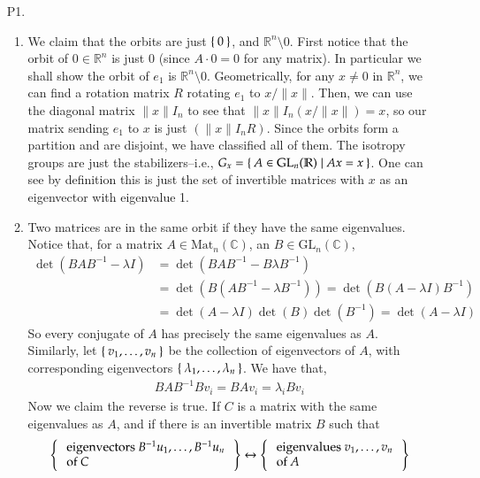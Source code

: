 \documentclass[12pt]{article}
\theoremstyle{definitionstyle}
\def\mbb#1{\mathbb{#1}}
\def \C{\mbb{C}}
\def \R{\mbb{R}}
\newcommand{\mg}[1]{\| #1 \|}
\begin{document}
\begin{enumerate}[leftmargin=\labelsep]
		\item[P1.]
		\begin{enumerate}
			\item We claim that the orbits are just $\Set{0}$, and $\R^n \setminus 0$. First notice that the orbit of $0 \in \R^n$ is just $0$ (since $A \cdot 0 = 0$ for any matrix). In particular we shall show the orbit of $e_1$ is $\R^n \setminus 0$. Geometrically, for any $x \neq 0$ in $\R^n$, we can find a rotation matrix $R$ rotating $e_1$ to $x/\mg{x}$. Then, we can use the diagonal matrix $\mg{x} I_n$ to see that $\mg{x} I_n (x/\mg{x}) = x$, so our matrix sending $e_1$ to $x$ is just $(\mg{x}I_nR)$. Since the orbits form a partition and are disjoint, we have classified all of them. The isotropy groups are just the stabilizers--i.e., $G_x = \Set{A \in \mathrm{GL}_n(\R) | Ax = x}$. One can see by definition this is just the set of invertible matrices with $x$ as an eigenvector with eigenvalue 1. 
			
			\item Two matrices are in the same orbit if they have the same eigenvalues. Notice that, for a matrix $A \in \mathrm{Mat}_n(\C)$, an $B \in \mathrm{GL}_n(\C)$,
			\begin{align*}
				\det(BAB^{-1} - \lambda I) &= \det(BAB^{-1} -  B\lambda B^{-1}) 
				\\&= \det(B(AB^{-1} - \lambda B^{-1})) = \det(B(A-\lambda I)B^{-1}) 
				\\&= \det(A-\lambda I)\det(B)\det(B^{-1}) = \det(A-\lambda I)
			\end{align*}
			So every conjugate of $A$ has precisely the same eigenvalues as $A$. Similarly, let $\Set{v_1, \ldots, v_n}$ be the collection of eigenvectors of $A$, with corresponding eigenvectors $\Set{\lambda_1, \ldots, \lambda_n}$. We have that,
			\begin{align*}
				BAB^{-1} Bv_i = BAv_i = \lambda_i Bv_i
			\end{align*}
			Now we claim the reverse is true. If $C$ is a matrix with the same eigenvalues as $A$, and if there is an invertible matrix $B$ such that 
			\begin{align*}
				\Set{\begin{array}{l}\text{eigenvectors $B^{-1}u_1, \ldots, B^{-1}u_n$} \\ \text{of $C$}\end{array}} \leftrightarrow \Set{\begin{array}{l}
						\text{eigenvalues $v_1, \ldots, v_n$} \\
						\text{of $A$}
				\end{array}}
			\end{align*}
		\end{enumerate}
	\end{enumerate}
\end{document}
